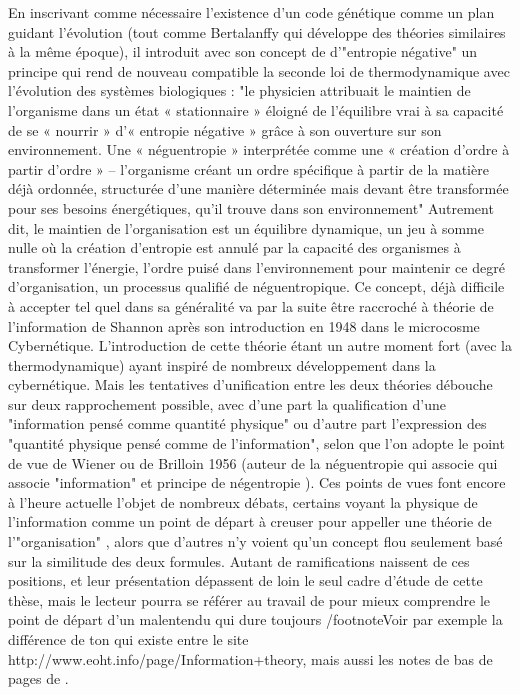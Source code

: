 {En inscrivant comme nécessaire l'existence d'un code génétique comme un plan guidant l'évolution (tout comme Bertalanffy qui développe des théories similaires à la même époque), il introduit avec son concept de d'"entropie négative" un principe qui rend de nouveau compatible la seconde loi de thermodynamique avec l'évolution des systèmes biologiques : "le physicien attribuait le maintien de l’organisme dans un état « stationnaire » éloigné de l’équilibre vrai à sa capacité de se « nourrir » d’« entropie négative » grâce à son ouverture sur son environnement. Une « néguentropie » interprétée comme une « création d’ordre à partir d’ordre » -- l’organisme créant un ordre spécifique à partir de la matière déjà ordonnée, structurée d’une manière déterminée mais devant être transformée pour ses besoins énergétiques, qu’il trouve dans son environnement" \autocite[502]{Pouvreau2013} Autrement dit, le maintien de l'organisation est un équilibre dynamique, un jeu à somme nulle où la création d'entropie est annulé par la capacité des organismes à transformer l'énergie, l'ordre puisé dans l'environnement pour maintenir ce degré d'organisation, un processus qualifié de néguentropique. Ce concept, déjà difficile à accepter tel quel dans sa généralité \autocite[225]{Lemoigne1977} va par la suite être raccroché à théorie de l'information de Shannon après son introduction en 1948 dans le microcosme Cybernétique. L'introduction de cette théorie étant un autre moment fort (avec la thermodynamique) ayant inspiré de nombreux développement dans la cybernétique. Mais les tentatives d'unification entre les deux théories débouche sur deux rapprochement possible, avec d'une part la qualification d'une "information pensé comme quantité physique" ou d'autre part l'expression des "quantité physique pensé comme de l'information", selon que l'on adopte le point de vue de Wiener ou de Brilloin 1956 (auteur de la néguentropie qui associe qui associe "information" et principe de négentropie ). Ces points de vues font encore à l'heure actuelle l'objet de nombreux débats, certains voyant la physique de l'information comme un point de départ à creuser pour appeller une théorie de l'"organisation" \autocite[37-38]{Morin2005}, alors que d'autres n'y voient qu'un concept flou seulement basé sur la similitude des deux formules.  Autant de ramifications naissent de ces positions, et leur présentation dépassent de loin le seul cadre d'étude de cette thèse, mais le lecteur pourra se référer au travail de \autocite{Triclot2007} pour mieux comprendre le point de départ d'un malentendu qui dure toujours /footnote{Voir par exemple la différence de ton qui existe entre le site http://www.eoht.info/page/Information+theory, mais aussi les notes de bas de pages de \autocite[277]{Lemoigne1977} }. 

}

